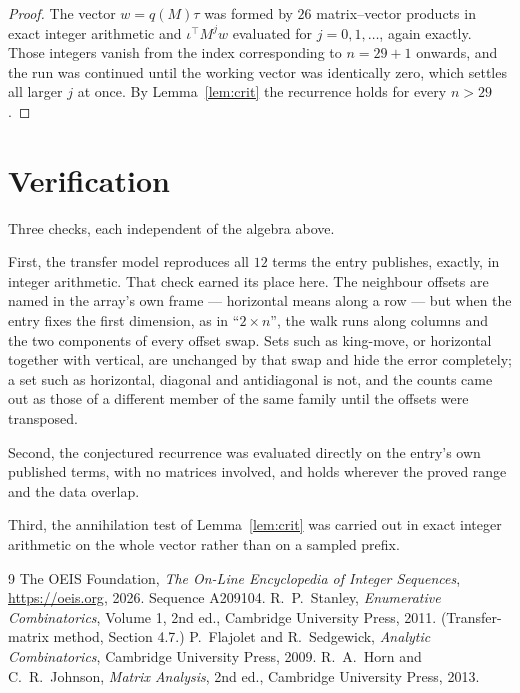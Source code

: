 \documentclass[11pt,a4paper]{article}
\theoremstyle{plain}
\theoremstyle{definition}
\begin{document}
\begin{proof}
The vector $w=q(M)\tau$ was formed by $26$ matrix--vector products in exact integer
arithmetic and $\iota^{\!\top}M^{j}w$ evaluated for $j=0,1,\dots$, again exactly. Those
integers vanish from the index corresponding to $n=29+1$ onwards, and the run was
continued until the working vector was identically zero, which settles all larger $j$ at once.
By Lemma~\ref{lem:crit} the recurrence holds for every $n>29$.
\end{proof}

\section{Verification}

Three checks, each independent of the algebra above.

First, the transfer model reproduces all $12$ terms the entry publishes, exactly, in
integer arithmetic. That check earned its place here. The neighbour offsets are named in the
array's own frame --- horizontal means along a row --- but when the entry fixes the first
dimension, as in ``$2\times n$'', the walk runs along columns and the two components of every
offset swap. Sets such as king-move, or horizontal together with vertical, are unchanged by
that swap and hide the error completely; a set such as horizontal, diagonal and antidiagonal
is not, and the counts came out as those of a different member of the same family until the
offsets were transposed.

Second, the conjectured recurrence was evaluated directly on the entry's own published terms,
with no matrices involved, and holds wherever the proved range and the data overlap.

Third, the annihilation test of Lemma~\ref{lem:crit} was carried out in exact integer
arithmetic on the whole vector rather than on a sampled prefix.

\begin{thebibliography}{9}
 The OEIS Foundation, \emph{The On-Line Encyclopedia of Integer
Sequences}, \url{https://oeis.org}, 2026. Sequence A209104.
 R.~P.~Stanley, \emph{Enumerative Combinatorics}, Volume 1, 2nd ed.,
Cambridge University Press, 2011. (Transfer-matrix method, Section 4.7.)
 P.~Flajolet and R.~Sedgewick, \emph{Analytic Combinatorics}, Cambridge
University Press, 2009.
 R.~A.~Horn and C.~R.~Johnson, \emph{Matrix Analysis}, 2nd ed., Cambridge
University Press, 2013.
\end{thebibliography}
\end{document}
